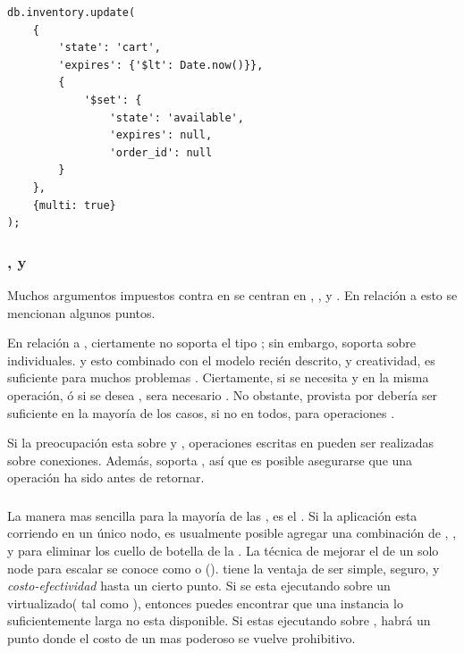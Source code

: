 \begin{lstlisting}[caption= Ejemplo de \scriptPL corriendo \backgroundPL., label=source:javascript:example_add_script_background_mongodb]
db.inventory.update(
	{
		'state': 'cart',
		'expires': {'$lt': Date.now()}},
		{
			'$set': {
				'state': 'available',
				'expires': null,
				'order_id': null
		}
	},
	{multi: true}
);
\end{lstlisting} 

\subsubsection{\transactionsDB, \consistencyDB y \durabilityDB}

Muchos argumentos impuestos contra \nosqlNAME en \ecommerce se centran en \transactionsDB, \consistencyDB, y \durabilityDB. En relación a esto se mencionan algunos puntos.

En relación a \transactionsDB, ciertamente \mongodbNAME no soporta el tipo \multiObjectDB; sin embargo, soporta \atomicOperationsDB sobre \documentsDB individuales. y esto combinado con el modelo \documentOriented recién descrito, y creatividad, es suficiente para muchos problemas \ecommerce. Ciertamente, si se necesita \debitOneAccount y \creditAnother en la misma operación, ó si se desea \rollbackDB, sera necesario \fullFledgedTransDB. No obstante, \transactionalityDB provista por \mongodbNAME debería ser suficiente en la mayoría de los casos, si no en todos, para operaciones \ecommerce.

Si la preocupación esta sobre \consistencyDB y \durabilityDB, operaciones escritas en \mongodbNAME pueden ser realizadas \consistencyDB sobre conexiones. Además,  soporta \nearRealTimeReplicationDB, así que es posible asegurarse que una operación ha sido \replicatedDB antes de retornar.

\subsubsection{\scalabilityQA}
La manera mas sencilla para \scale la mayoría de las \dataBasesDB, es \upgradingPC el \hardwarePC. Si la aplicación esta corriendo en un único nodo, es usualmente posible agregar una combinación de \diskPC \iopsPC, \memoryPC, y \cpuPC para eliminar los cuello de botella de la \dataBaseDB. La técnica de mejorar el \hardwarePC de un solo node para escalar se conoce como \verticalScalingDB o \scalingUpDB(). \verticalScalingDB tiene la ventaja de ser simple, seguro, y \textit{costo-efectividad} hasta un cierto punto. Si se esta ejecutando sobre un \hardwarePC virtualizado( tal como \amazonEcdosNAME), entonces puedes encontrar que una instancia lo suficientemente larga no esta disponible. Si estas ejecutando sobre \physHardwarePC, habrá un punto donde el costo de un \serverAS mas poderoso se vuelve prohibitivo.

